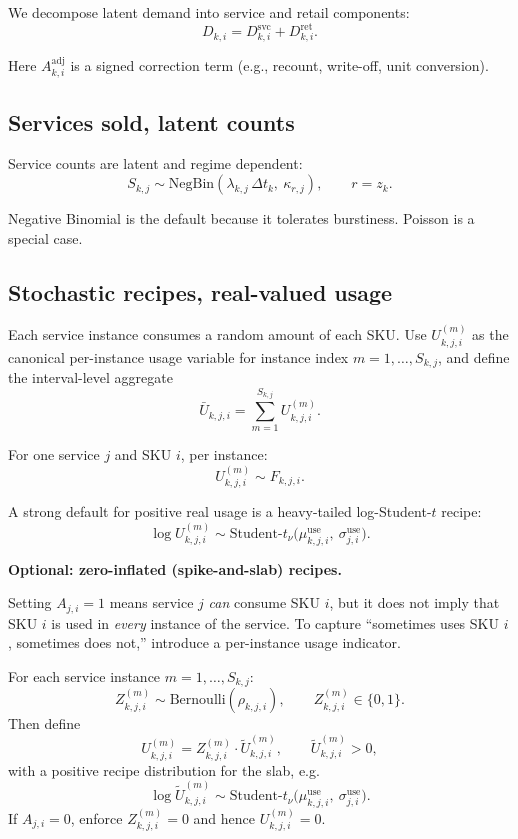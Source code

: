 \documentclass[11pt]{article}
\begin{document}
We decompose latent demand into service and retail components:
\[
  D_{k,i} = D^{\mathrm{svc}}_{k,i} + D^{\mathrm{ret}}_{k,i}.
\]

Here $A^{\mathrm{adj}}_{k,i}$ is a signed correction term (e.g., recount, write-off, unit conversion).

\subsection{Services sold, latent counts}

Service counts are latent and regime dependent:
\[
  S_{k,j} \sim \text{NegBin}(\lambda_{k,j}\,\Delta t_k,\ \kappa_{r,j}),\qquad r=z_k.
\]

Negative Binomial is the default because it tolerates burstiness. Poisson is a special case.

\subsection{Stochastic recipes, real-valued usage}

Each service instance consumes a random amount of each SKU.
Use $U^{(m)}_{k,j,i}$ as the canonical per-instance usage variable for instance index $m=1,\dots,S_{k,j}$, and define the interval-level aggregate
\[
  \bar U_{k,j,i}=\sum_{m=1}^{S_{k,j}} U^{(m)}_{k,j,i}.
\]

For one service $j$ and SKU $i$, per instance:
\[
  U^{(m)}_{k,j,i} \sim F_{k,j,i}.
\]

A strong default for positive real usage is a heavy-tailed log-Student-$t$ recipe:
\[
  \log U^{(m)}_{k,j,i} \sim \text{Student-}t_{\nu}\bigl(\mu^{\mathrm{use}}_{k,j,i},\ \sigma^{\mathrm{use}}_{j,i}\bigr).
\]

\textbf{Optional: zero-inflated (spike-and-slab) recipes.}

Setting $A_{j,i}=1$ means service $j$ \emph{can} consume SKU $i$, but it does not imply that SKU $i$ is used in \emph{every} instance of the service.
To capture ``sometimes uses SKU $i$, sometimes does not,'' introduce a per-instance usage indicator.

For each service instance $m=1,\dots,S_{k,j}$:
\[
  Z^{(m)}_{k,j,i} \sim \text{Bernoulli}(\rho_{k,j,i}),\qquad Z^{(m)}_{k,j,i} \in \{0,1\}.
\]
Then define
\[
  U^{(m)}_{k,j,i} = Z^{(m)}_{k,j,i} \cdot \tilde U^{(m)}_{k,j,i},\qquad \tilde U^{(m)}_{k,j,i} > 0,
\]
with a positive recipe distribution for the slab, e.g.
\[
  \log \tilde U^{(m)}_{k,j,i} \sim \text{Student-}t_{\nu}\bigl(\mu^{\mathrm{use}}_{k,j,i},\ \sigma^{\mathrm{use}}_{j,i}\bigr).
\]
If $A_{j,i}=0$, enforce $Z^{(m)}_{k,j,i}=0$ and hence $U^{(m)}_{k,j,i}=0$.
\end{document}
